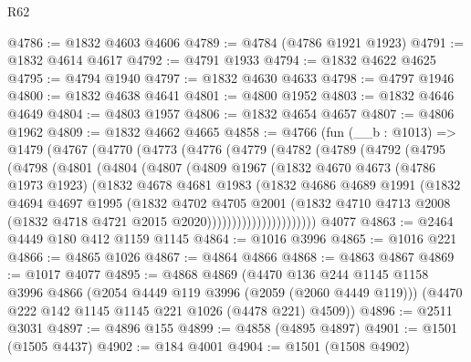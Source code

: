 \begin{lexlean}{R62}
\begin{coremodule}
@4786 := @1832 @4603 @4606
@4789 := @4784 (@4786 @1921 @1923)
@4791 := @1832 @4614 @4617
@4792 := @4791 @1933
@4794 := @1832 @4622 @4625
@4795 := @4794 @1940
@4797 := @1832 @4630 @4633
@4798 := @4797 @1946
@4800 := @1832 @4638 @4641
@4801 := @4800 @1952
@4803 := @1832 @4646 @4649
@4804 := @4803 @1957
@4806 := @1832 @4654 @4657
@4807 := @4806 @1962
@4809 := @1832 @4662 @4665
@4858 := @4766
    (fun (__b : @1013) =>
    @1479
      (@4767
        (@4770
          (@4773
            (@4776
              (@4779
                (@4782
                  (@4789
                    (@4792
                      (@4795
                        (@4798
                          (@4801
                            (@4804
                              (@4807
                                (@4809
                                  @1967
                                  (@1832
                                    @4670
                                    @4673
                                    (@4786 @1973 @1923)
                                    (@1832
                                      @4678
                                      @4681
                                      @1983
                                      (@1832
                                        @4686
                                        @4689
                                        @1991
                                        (@1832
                                          @4694
                                          @4697
                                          @1995
                                          (@1832
                                            @4702
                                            @4705
                                            @2001
                                            (@1832
                                              @4710
                                              @4713
                                              @2008
                                              (@1832 @4718 @4721 @2015 @2020))))))))))))))))))))))
    @4077
@4863 := @2464 @4449 @180 @412 @1159 @1145
@4864 := @1016 @3996
@4865 := @1016 @221
@4866 := @4865 @1026
@4867 := @4864 @4866
@4868 := @4863 @4867
@4869 := @1017 @4077
@4895 := @4868
    @4869
    (@4470
      @136
      @244
      @1145
      @1158
      @3996
      @4866
      (@2054 @4449 @119 @3996 (@2059 (@2060 @4449 @119)))
      (@4470 @222 @142 @1145 @1145 @221 @1026 (@4478 @221) @4509))
@4896 := @2511 @3031
@4897 := @4896 @155
@4899 := @4858 (@4895 @4897)
@4901 := @1501 (@1505 @4437)
@4902 := @184 @4001
@4904 := @1501 (@1508 @4902)

\end{coremodule}
\end{lexlean}
